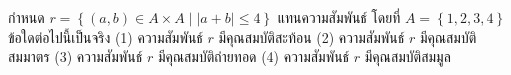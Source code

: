 ﻿%
\question กำหนด $r = \left\{(a, b) \in A\times A \mid  \left\lvert a+b\right\rvert \leq 4 \right\}$ แทนความสัมพันธ์ โดยที่ $A=\left\{1,2,3,4\right\} $ ข้อใดต่อไปนี้เป็นจริง \newline
(1) ความสัมพันธ์ $r$ มีคุณสมบัติสะท้อน \newline
(2) ความสัมพันธ์ $r$ มีคุณสมบัติสมมาตร \newline
(3) ความสัมพันธ์ $r$ มีคุณสมบัติถ่ายทอด \newline
(4) ความสัมพันธ์ $r$ มีคุณสมบัติสมมูล \newline
\newline
{}
